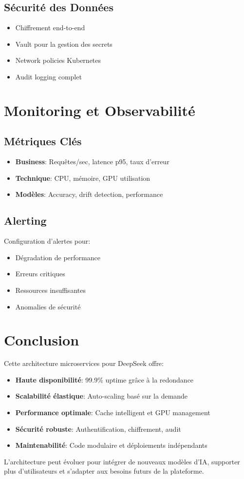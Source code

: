 \documentclass[12pt,a4paper]{article}
\begin{document}
\subsection{Sécurité des Données}
\begin{itemize}
    \item Chiffrement end-to-end
    \item Vault pour la gestion des secrets
    \item Network policies Kubernetes
    \item Audit logging complet
\end{itemize}

\newpage
\section{Monitoring et Observabilité}
\subsection{Métriques Clés}
\begin{itemize}
    \item \textbf{Business}: Requêtes/sec, latence p95, taux d'erreur
    \item \textbf{Technique}: CPU, mémoire, GPU utilisation
    \item \textbf{Modèles}: Accuracy, drift detection, performance
\end{itemize}

\subsection{Alerting}
Configuration d'alertes pour:
\begin{itemize}
    \item Dégradation de performance
    \item Erreurs critiques
    \item Ressources insuffisantes
    \item Anomalies de sécurité
\end{itemize}

\section{Conclusion}
Cette architecture microservices pour DeepSeek offre:

\begin{itemize}
    \item \textbf{Haute disponibilité}: 99.9\% uptime grâce à la redondance
    \item \textbf{Scalabilité élastique}: Auto-scaling basé sur la demande
    \item \textbf{Performance optimale}: Cache intelligent et GPU management
    \item \textbf{Sécurité robuste}: Authentification, chiffrement, audit
    \item \textbf{Maintenabilité}: Code modulaire et déploiements indépendants
\end{itemize}

L'architecture peut évoluer pour intégrer de nouveaux modèles d'IA, supporter plus d'utilisateurs et s'adapter aux besoins futurs de la plateforme.
\end{document}
